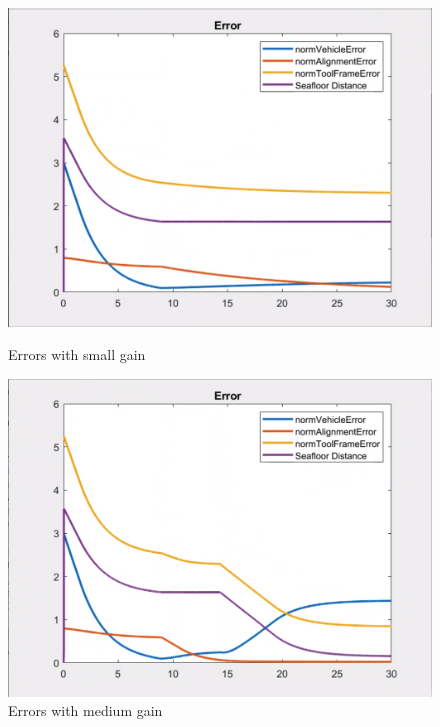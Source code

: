 \documentclass{article}
\begin{document}
\begin{figure}[htpb] 
\begin{minipage}{0.40\textwidth}  
\includegraphics[width=\textwidth]{313_s_Errors.png}
\caption{Errors with small gain}\label{err_w_s} 
\end{minipage}  
\hspace{0.2\textwidth} 
\begin{minipage}{0.40\textwidth}  
\includegraphics[width=\textwidth]{313_m_Errors.png}
\caption{Errors with medium gain}\label{err_w_m} 
\end{minipage} 
\hspace{0.2\textwidth} 
\begin{minipage}{0.40\textwidth}  

\end{minipage}
\end{figure}
\end{document}
